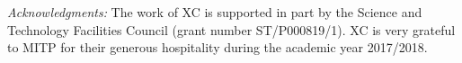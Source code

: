 \documentclass[english,12pt]{article}
\begin{document}



{\it Acknowledgments:}
The work of XC is supported in part  by the Science and Technology Facilities Council (grant number  ST/P000819/1). XC is very grateful to MITP for their generous hospitality during the academic year 2017/2018. 



\bigskip{}


\baselineskip=1.6pt 

\begin{thebibliography}{10}

   
\end{thebibliography}
\end{document}
